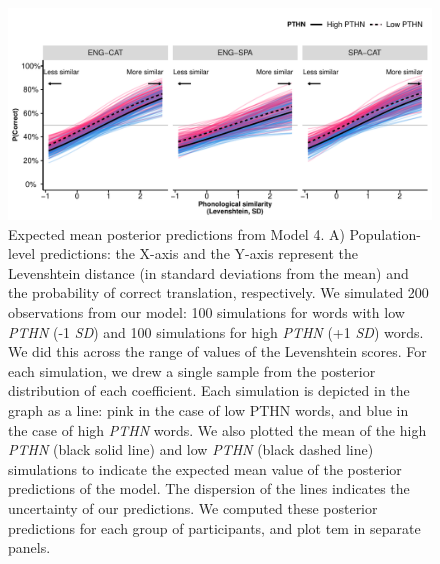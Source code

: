 \documentclass[
  english,
  man,floatsintext]{apa6}
\begin{document}
\begin{figure}
\centering
\includegraphics{manuscript_files/figure-latex/marginaleffects-1.pdf}
\caption{\label{fig:marginaleffects}Expected mean posterior predictions from Model 4. A) Population-level predictions: the X-axis and the Y-axis represent the Levenshtein distance (in standard deviations from the mean) and the probability of correct translation, respectively. We simulated 200 observations from our model: 100 simulations for words with low \emph{PTHN} (-1 \emph{SD}) and 100 simulations for high \emph{PTHN} (+1 \emph{SD}) words. We did this across the range of values of the Levenshtein scores. For each simulation, we drew a single sample from the posterior distribution of each coefficient. Each simulation is depicted in the graph as a line: pink in the case of low PTHN words, and blue in the case of high \emph{PTHN} words. We also plotted the mean of the high \emph{PTHN} (black solid line) and low \emph{PTHN} (black dashed line) simulations to indicate the expected mean value of the posterior predictions of the model. The dispersion of the lines indicates the uncertainty of our predictions. We computed these posterior predictions for each group of participants, and plot tem in separate panels.}
\end{figure}
\end{document}
